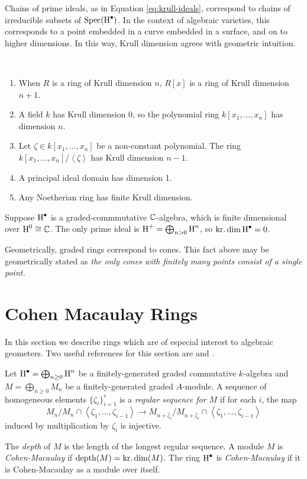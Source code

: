 Chains of prime ideals, as in Equation \ref{eq:krull-ideals}, correspond to chains of irreducible subsets of $\operatorname{Spec}(\operatorname{H}^\bullet)$. In the context of algebraic varieties, this corresponds to a point embedded in a curve embedded in a surface, and on to higher dimensions. In this way, Krull dimension agrees with geometric intuition.

\begin{example} ~
  \begin{enumerate}
  \item When $R$ is a ring of Krull dimension $n$, $R[x]$ is a ring of Krull dimension $n+1$.
  \item A field $k$ has Krull dimension 0, so the polynomial ring $k[x_1,\ldots,x_n]$ has dimension $n$.
  \item Let $\zeta \in k[x_1,\ldots,x_n]$ be a non-constant polynomial. The ring $k[x_1,\ldots,x_n] / \left<\zeta\right>$ has Krull dimension $n-1$.
  \item A principal ideal domain has dimension 1.
  \item Any Noetherian ring has finite Krull dimension.
  \end{enumerate}
\end{example}

\begin{example}
  Suppose $\operatorname{H}^\bullet$ is a graded-commmutative $\mathbb{C}$-algebra, which is finite dimensional over $\operatorname{H}^0 \cong \mathbb{C}$. The only prime ideal is $\operatorname{H}^+ = \bigoplus_{n > 0} \operatorname{H}^n$, so $\operatorname{kr.dim} \operatorname{H}^\bullet = 0$.

  Geometrically, graded rings correspond to cones. This fact above may be geometrically stated as \emph{the only cones with finitely many points consist of a single point.}
\end{example}

\section{Cohen Macaulay Rings}
\label{sec:cm}

In this section we describe rings which are of especial interest to algebraic geometers. Two useful references for this section are \cite[\S 5.4]{MR1634407} and \cite[\S 18]{MR1322960}.

\begin{definition}
  Let $\operatorname{H}^\bullet = \bigoplus_{n \geq 0} \operatorname{H}^n$ be a finitely-generated graded commutative $k$-algebra and $M = \bigoplus_{n \geq 0} M_n$ be a finitely-generated graded $A$-module. A sequence of homogeneous elements $\{\zeta_i\}_{i = 1}^r$ is a \emph{regular sequence for $M$} if for each $i$, the map
  \[
    M_n / M_n \cap \left< \zeta_1, \ldots, \zeta_{i-1}\right> \to M_{n+\bar \zeta_i} / M_{n + \bar \zeta_i} \cap \left< \zeta_1, \ldots, \zeta_{i-1}\right>
  \]
  induced by multiplication by $\zeta_i$ is injective.

  The \emph{depth} of $M$ is the length of the longest regular sequence. A module $M$ is \emph{Cohen-Macaulay} if $\operatorname{depth}(M) = \operatorname{kr.dim}(M)$.  The ring $\operatorname{H}^\bullet$ is \emph{Cohen-Macaulay} if it is Cohen-Macaulay as a module over itself.
\end{definition}

